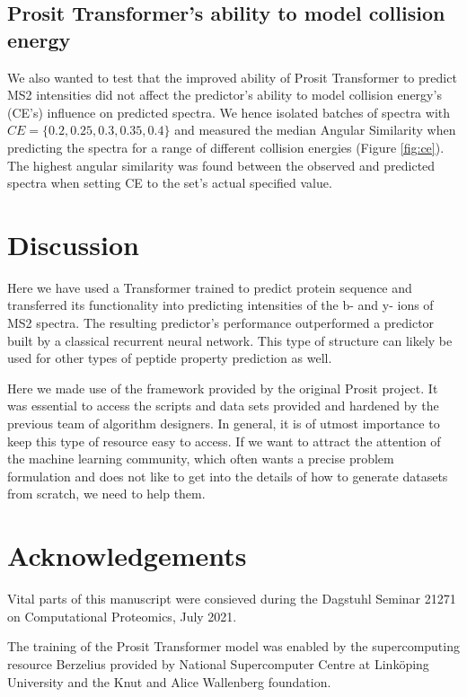 \documentclass[10pt,a4paper]{article}
\begin{document}
\subsection*{Prosit Transformer’s ability to model collision energy}

    
We also wanted to test that the improved ability of Prosit Transformer to predict MS2 intensities did not affect the predictor’s ability to model collision energy’s (CE’s) influence on predicted spectra. We hence isolated batches of spectra with $CE=\{0.2, 0.25, 0.3, 0.35, 0.4\}$ and measured the median Angular Similarity when predicting the spectra for a range of different collision energies (Figure \ref{fig:ce}). The highest angular similarity was found between the observed and predicted spectra when setting CE to the set’s actual specified value.

\section*{Discussion}
Here we have used a Transformer trained to predict protein sequence and transferred its functionality into predicting intensities of the b- and y- ions of MS2 spectra. The resulting predictor’s performance outperformed a predictor built by a classical recurrent neural network. This type of structure can likely be used for other types of peptide property prediction as well.

Here we made use of the framework provided by the original Prosit project. It was essential to access the scripts and data sets provided and hardened by the previous team of algorithm designers. In general, it is of utmost importance to keep this type of resource easy to access. If we want to attract the attention of the machine learning community, which often wants a precise problem formulation and does not like to get into the details of how to generate datasets from scratch, we need to help them.


\section*{Acknowledgements}
Vital parts of this manuscript were consieved during the Dagstuhl Seminar 21271 on Computational Proteomics, July 2021.

The training of the Prosit Transformer model was enabled by the supercomputing resource Berzelius provided by National Supercomputer Centre at Linköping University and the Knut and Alice Wallenberg foundation.
\end{document}
